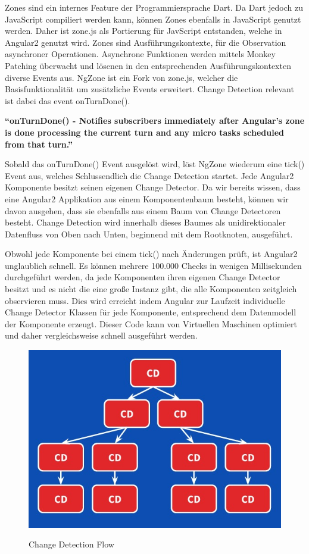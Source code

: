 Zones sind ein internes Feature der Programmiersprache Dart. Da Dart jedoch zu JavaScript compiliert werden kann,
können Zones ebenfalls in JavaScript genutzt werden. Daher ist zone.js als Portierung für JavScript entstanden, welche in Angular2 genutzt wird.
Zones sind Ausführungskontexte, für die Observation asynchroner Operationen.
Asynchrone Funktionen werden mittels Monkey Patching überwacht und lösenen in den entsprechenden Ausführungskontexten diverse Events aus.
NgZone ist ein Fork von zone.js, welcher die Basisfunktionalität um zusätzliche Events erweitert.
Change Detection relevant ist dabei das event onTurnDone().
\cite{changedetection-explained}

\vspace{0.5cm}
\textbf{``onTurnDone() - Notifies subscribers immediately after Angular’s zone is done processing the current turn and any micro tasks scheduled from that turn.''}
\cite{ZONESINANGULAR2}
\vspace{0.5cm}

Sobald das onTurnDone() Event ausgelöst wird, löst NgZone wiederum eine tick() Event aus, welches Schlussendlich die Change Detection startet.
Jede Angular2 Komponente besitzt seinen eigenen Change Detector. Da wir bereits wissen, dass eine Angular2 Applikation aus einem Komponentenbaum besteht,
können wir davon ausgehen, dass sie ebenfalls aus einem Baum von Change Detectoren besteht.
Change Detection wird innerhalb dieses Baumes als unidirektionaler Datenfluss von Oben nach Unten, beginnend mit dem Rootknoten, ausgeführt.

Obwohl jede Komponente bei einem tick() nach Änderungen prüft, ist Angular2 unglaublich schnell. Es können mehrere 100.000 Checks in wenigen Millisekunden durchgeführt werden,
da jede Komponenten ihren eigenen Change Detector besitzt und es nicht die eine große Instanz gibt, die alle Komponenten zeitgleich observieren muss.
Dies wird erreicht indem Angular zur Laufzeit individuelle Change Detector Klassen für jede Komponente, entsprechend dem Datenmodell der Komponente erzeugt.
Dieser Code kann von Virtuellen Maschinen optimiert und daher vergleichsweise schnell ausgeführt werden.

\begin{figure}[ht]
 \centering
 \includegraphics[width=0.7\linewidth]{kapitel3/cd-tree.jpg}
 \caption{Change Detection Flow}\cite{changedetection-explained}
\end{figure}


